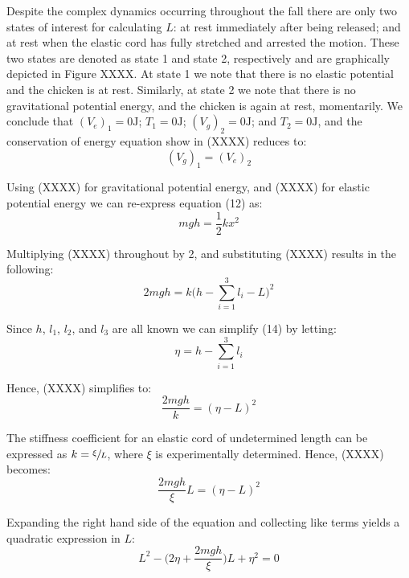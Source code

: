 \documentclass[a4paper]{article}
\begin{document}
Despite the complex dynamics occurring throughout the fall there are only two states of interest for calculating $L$: at rest immediately after being released; and at rest when the elastic cord has fully stretched and arrested the motion. These two states are denoted as state 1 and state 2, respectively and are graphically depicted in Figure XXXX. At state 1 we note that there is no elastic potential and the chicken is at rest. Similarly, at state 2 we note that there is no gravitational potential energy, and the chicken is again at rest, momentarily. We conclude that $(V_e)_1 = 0 \si{\joule}$; $T_1 = 0 \si{\joule}$; $(V_g)_2 = 0\si{\joule}$; and $T_2 = 0 \si{\joule}$, and the conservation of energy equation show in (XXXX) reduces to:
\begin{equation}
(V_g)_1 = (V_e)_2
\end{equation}

Using (XXXX) for gravitational potential energy, and (XXXX) for elastic potential energy we can re-express equation (12) as:
\begin{equation}
mgh = \frac{1}{2}kx^2
\end{equation}

Multiplying (XXXX) throughout by 2, and substituting (XXXX) results in the following:
\begin{equation}
2mgh = k\bigg(h - \sum_{i=1}^{3} l_i - L \bigg)^2
\end{equation}

Since $h$, $l_1$, $l_2$, and $l_3$ are all known we can simplify (14) by letting:
\begin{equation}
\eta = h - \sum_{i=1}^{3} l_i
\end{equation}

Hence, (XXXX) simplifies to:
\begin{equation}
\frac{2mgh}{k} = (\eta - L)^2
\end{equation}

The stiffness coefficient for an elastic cord of undetermined length can be expressed as $k = \sfrac{\xi}{L}$, where $\xi$ is experimentally determined. Hence, (XXXX) becomes:
\begin{equation}
\frac{2mgh}{\xi} L = (\eta - L)^2
\end{equation}

Expanding the right hand side of the equation and collecting like terms yields a quadratic expression in $L$:
\begin{equation}
L^2 - \bigg(2\eta + \frac{2mgh}{\xi}\bigg)L + \eta^2 = 0
\end{equation}
\end{document}
